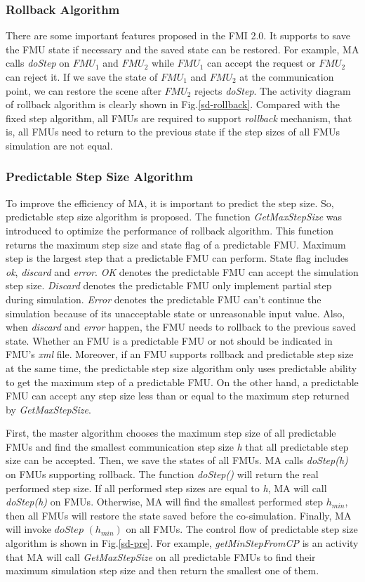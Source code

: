 \subsubsection{Rollback Algorithm}
There are some important features proposed in the FMI 2.0. It supports to save the FMU state if necessary and the saved state can be restored. For example, MA calls \emph{doStep} on $FMU_{1}$ and $FMU_{2}$ while $FMU_{1}$ can accept the request or $FMU_{2}$ can reject it. If we save the state of $FMU_{1}$ and $FMU_{2}$ at the communication point, we can restore the scene after $FMU_{2}$ rejects \emph{doStep}. The activity diagram of rollback algorithm is clearly shown in Fig.\ref{sd-rollback}. Compared with the fixed step algorithm, all FMUs are required to support \emph{rollback} mechanism, that is, all FMUs need to return to the previous state if the  step sizes of all FMUs simulation are not equal.
\subsubsection{Predictable Step Size Algorithm}
To improve the efficiency of MA, it is important to predict the step size. So, predictable step size algorithm is proposed. The function \emph{GetMaxStepSize} was introduced to optimize the performance of rollback algorithm. This function returns the maximum step size and state flag of a predictable FMU. Maximum step is the largest step that a predictable FMU can perform. State flag includes \emph{ok}, \emph{discard} and \emph{error}. \emph{OK} denotes the predictable FMU can accept the simulation step size. \emph{Discard} denotes the predictable FMU only implement partial step during simulation. \emph{Error} denotes the predictable FMU can't continue the simulation because of its unacceptable state or unreasonable input value. Also, when \emph{discard} and \emph{error} happen, the FMU needs to rollback to the previous saved state. Whether an FMU is a predictable FMU or not should be indicated in FMU's \emph{xml} file. Moreover, if an FMU supports rollback and predictable step size at the same time, the predictable step size algorithm only uses predictable ability to get the maximum step of a predictable FMU. On the other hand, a predictable FMU can accept any step size less than or equal to the maximum step returned by \emph{GetMaxStepSize}.

First, the master algorithm chooses the maximum step size of all predictable FMUs and find the smallest communication step size \emph{h} that all predictable step size can be accepted. Then, we save the states of all FMUs. MA calls \emph{doStep(h)} on FMUs supporting rollback. The function \emph{doStep()} will return the real performed step size. If all performed step sizes are equal to \emph{h}, MA will call \emph{doStep(h)} on FMUs. Otherwise, MA will find the smallest performed step $h_{min}$, then all FMUs will restore the state saved before the co-simulation. Finally, MA will invoke $doStep$ $(h_{min})$ on all FMUs. The control flow of predictable step size algorithm is shown in Fig.\ref{sd-pre}. For example, \emph{getMinStepFromCP} is an activity that MA will call \emph{GetMaxStepSize} on all predictable FMUs to find their maximum simulation step size and then return the smallest one of them. 

